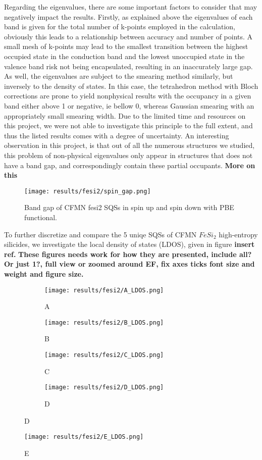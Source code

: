 Regarding the eigenvalues, there are some important factors to consider that may negatively impact the results. Firstly, as explained above the eigenvalues of each band is given for the total number of k-points employed in the calculation, obviously this leads to a relationship between accuracy and number of points. A small mesh of k-points may lead to the smallest transition between the highest occupied state in the conduction band and the lowest unoccupied state in the valence band risk not being encapsulated, resulting in an inaccurately large gap. As well, the eigenvalues are subject to the smearing method similarly, but inversely to the density of states. In this case, the tetrahedron method with Bloch corrections are prone to yield nonphysical results with the occupancy in a given band either above 1 or negative, ie bellow 0, whereas Gaussian smearing with an appropriately small smearing width. Due to the limited time and resources on this project, we were not able to investigate this principle to the full extent, and thus the listed results comes with a degree of uncertainty. An interesting observation in this project, is that out of all the numerous structures we studied, this problem of non-physical eigenvalues only appear in structures that does not have a band gap, and correspondingly contain these partial occupants. \textbf{More on this}

\begin{figure}[H]
\centering
\texttt{[image: results/fesi2/spin\_gap.png]}
\caption{Band gap of CFMN fesi2 SQSs in spin up and spin down with PBE functional.}
\label{DOS_hse06_B}
\end{figure}

To further discretize and compare the 5 uniqe SQSs of CFMN $FeSi_2$ high-entropy silicides, we investigate the local density of states (LDOS), given in figure \textbf{insert ref.} \textbf{These figures needs work for how they are presented, include all? Or just 1?, full view or zoomed around EF, fix axes ticks font size and weight and figure size.}

\begin{figure}[H]
\centering
	\begin{subfigure}{\textwidth}
		\texttt{[image: results/fesi2/A\_LDOS.png]}
		\caption{A}
	\end{subfigure}
	\begin{subfigure}{\textwidth}
		\texttt{[image: results/fesi2/B\_LDOS.png]}
		\caption{B}
	\end{subfigure}
	\begin{subfigure}{\textwidth}
		\texttt{[image: results/fesi2/C\_LDOS.png]}
		\caption{C}
	\end{subfigure}
	\begin{subfigure}{\textwidth}
		\texttt{[image: results/fesi2/D\_LDOS.png]}
		\caption{D}
	\end{subfigure}
\end{figure}		
\begin{figure}[H]
	\centering	
	\texttt{[image: results/fesi2/E\_LDOS.png]}
	\caption{E}
\end{figure}

